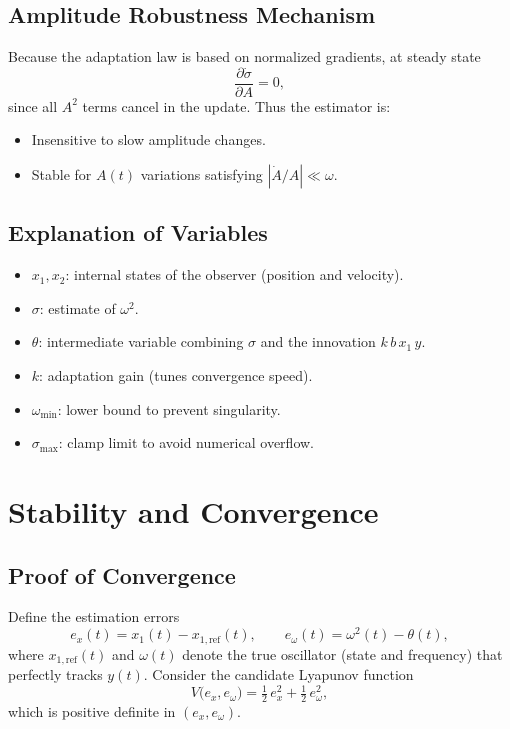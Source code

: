\documentclass{article}
\begin{document}
\subsection{Amplitude Robustness Mechanism}
Because the adaptation law is based on normalized gradients, at steady state
\[
\frac{\partial \dot{\sigma}}{\partial A} = 0,
\]
since all \(A^2\) terms cancel in the update.  Thus the estimator is:
\begin{itemize}
  \item Insensitive to slow amplitude changes.
  \item Stable for \(A(t)\) variations satisfying \(|\dot{A}/A|\ll\omega\).
\end{itemize}

\subsection{Explanation of Variables}
\begin{itemize}
  \item \(x_1, x_2\): internal states of the observer (position and velocity).
  \item \(\sigma\): estimate of \(\omega^2\).
  \item \(\theta\): intermediate variable combining \(\sigma\) and the innovation \(k\,b\,x_1\,y\).
  \item \(k\): adaptation gain (tunes convergence speed).
  \item \(\omega_{\min}\): lower bound to prevent singularity.
  \item \(\sigma_{\max}\): clamp limit to avoid numerical overflow.
\end{itemize}

\section{Stability and Convergence}

\subsection{Proof of Convergence}
Define the estimation errors
\[
  e_x(t) = x_1(t) - x_{1,\mathrm{ref}}(t), 
  \qquad
  e_\omega(t) = \omega^2(t) - \theta(t),
\]
where \(x_{1,\mathrm{ref}}(t)\) and \(\omega(t)\) denote the true oscillator (state and frequency) that perfectly tracks \(y(t)\).  Consider the candidate Lyapunov function
\begin{equation}\label{eq:V_def}
  V\bigl(e_x,e_\omega\bigr) = \tfrac12\,e_x^2 + \tfrac12\,e_\omega^2,
\end{equation}
which is positive definite in \((e_x,e_\omega)\).
\end{document}

